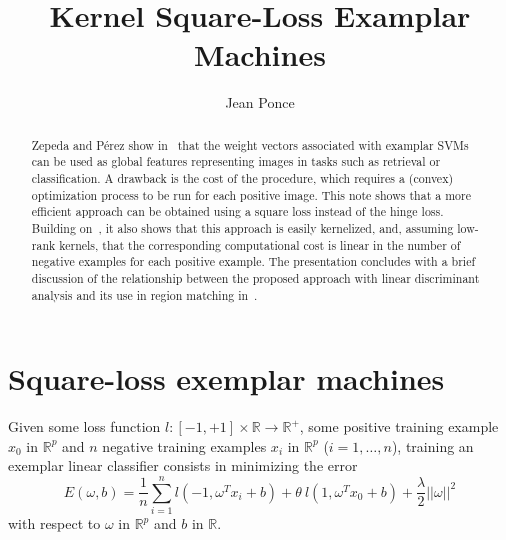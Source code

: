 \documentclass[12pt,letterpaper]{article}
\begin{document}
\def\RR{\mathbb{R}}
\def\PP{\mathbb{P}}
\def\AA{\mathbb{A}}
\def\LL{\mathbb{L}}
\def\SS{\mathbb{S}}
\def\barr{\bar{\mathbb{R}}}
\def\mat#1{{\mathcal{#1}}}
\def\vect#1{\mbox{\boldmath $#1$}}
\def\PPi{\mbox{\boldmath$\Pi$}}
\def\squig{\rightsquigarrow}
\def\comment#1{{}}
\def\qmatrix#1{\left[\begin{matrix}#1\end{matrix}\right]}

\title{Kernel Square-Loss Examplar Machines}
\author{Jean Ponce}
\maketitle

\begin{abstract}
Zepeda and P\'erez show in~\cite{ZePe15} that the weight vectors
associated with examplar SVMs can be used as global features
representing images in tasks such as retrieval or classification. A
drawback is the cost of the procedure, which requires a (convex)
optimization process to be run for each positive image. This note
shows that a more efficient approach can be obtained using a square
loss instead of the hinge loss. Building on~\cite{BaJo05,FiSc01}, it
also shows that this approach is easily kernelized, and, assuming
low-rank kernels, that the corresponding computational cost is linear
in the number of negative examples for each positive example. The
presentation concludes with a brief discussion of the relationship
between the proposed approach with linear discriminant analysis and
its use in region matching in~\cite{ARS14}.
\end{abstract}


\section{Square-loss exemplar machines\label{sec:sqesvm}}
Given some loss function $l:[-1,+1]\times \RR\rightarrow \RR^+$, some
positive training example $x_0$ in $\RR^p$ and $n$ negative training
examples $x_i$ in $\RR^p$ ($i=1,\ldots,n$), training an exemplar
linear classifier consists in minimizing the error
\begin{equation} 
E(\omega,b)=\frac{1}{n}\sum_{i=1}^n l(-1,\omega^T x_i+b)+ \theta \ l(1,\omega^T x_0+b)+\frac{\lambda}{2} ||\omega||^2
\label{eq:general}
\end{equation} 
with respect to $\omega$ in $\RR^p$ and $b$ in $\RR$.
\end{document}
